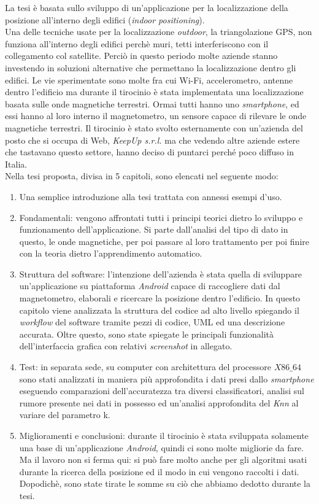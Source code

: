 \documentclass[10pt,a4paper]{article}
\begin{document}
	\noindent
	La tesi \`e basata sullo sviluppo di un'applicazione per la localizzazione della posizione all'interno degli edifici (\textit{indoor positioning}).\\  Una delle tecniche usate per la localizzazione \textit{outdoor}, la triangolazione GPS, non funziona all'interno degli edifici perch\`e muri, tetti  interferiscono con il collegamento col satellite. Perci\`o in questo periodo molte aziende stanno investendo in soluzioni alternative che permettano la localizzazione dentro gli edifici. Le vie sperimentate sono molte fra cui Wi-Fi, accelerometro, antenne dentro l'edificio ma durante il tirocinio  \`e stata implementata una localizzazione basata sulle onde magnetiche terrestri. Ormai tutti hanno uno \textit{smartphone}, ed essi hanno al loro interno il magnetometro, un sensore capace di rilevare le onde magnetiche terrestri. Il tirocinio \`e stato svolto esternamente con un'azienda del posto che si occupa di Web, \textit{KeepUp s.r.l.} ma che vedendo altre aziende estere che tastavano questo settore, hanno deciso di puntarci perch\'e poco diffuso in Italia.\\
	\noindent
	Nella tesi proposta, divisa in 5 capitoli, sono elencati nel seguente modo:
	\begin{enumerate}
		\item Una semplice introduzione alla tesi trattata con annessi esempi d'uso.
		\item Fondamentali: vengono affrontati tutti i principi teorici dietro lo sviluppo e funzionamento dell'applicazione. Si parte dall'analisi del tipo di dato in questo, le onde magnetiche, per poi passare al loro trattamento per poi finire con la teoria dietro l'apprendimento automatico.
		\item Struttura del software: l'intenzione dell'azienda \`e stata quella di sviluppare un'applicazione su piattaforma \textit{Android} capace di raccogliere dati dal magnetometro, elaborali e ricercare la posizione dentro l'edificio. In questo capitolo viene analizzata la struttura del codice ad alto livello spiegando il \textit{workflow} del software tramite pezzi di codice, UML ed una descrizione accurata. Oltre questo, sono state spiegate le principali funzionalit\`a dell'interfaccia grafica con relativi \textit{screenshot} in allegato.
		\item Test: in separata sede, su computer con architettura del processore $X86\_64$ sono stati analizzati in maniera pi\`u approfondita i dati  presi dallo \textit{smartphone} eseguendo comparazioni dell'accuratezza tra diversi classificatori, analisi sul rumore presente nei dati in possesso ed un'analisi approfondita del \textit{Knn} al variare del parametro k.
		\item Miglioramenti e conclusioni: durante il tirocinio \`e stata sviluppata solamente una base di un'applicazione \textit{Android}, quindi ci sono molte migliorie da fare. Ma il lavoro non si ferma qui: si pu\`o fare molto anche per gli algoritmi usati durante la ricerca della posizione ed il modo in cui vengono raccolti i dati. Dopodich\`e, sono state tirate le somme su ci\`o che abbiamo dedotto durante la tesi.
	\end{enumerate}
\end{document}
